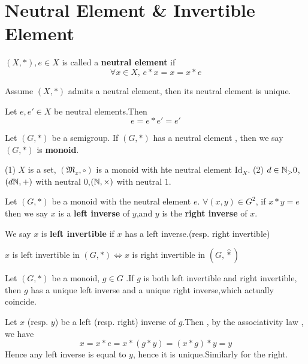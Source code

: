 \documentclass{book}
\numberwithin{equation}{section}
\begin{document}
\section{Neutral Element \& Invertible Element}
\begin{definitionenv}
    $(X,*),e\in X$ is called a \textbf{neutral element} if 
    $$\forall x\in X,\, e*x=x=x*e$$
\end{definitionenv}
\begin{propositionenv}
    Assume $(X,*)$ admits a neutral element, then its neutral element is unique.
\end{propositionenv}
\begin{proofenv}
    Let $e,e'\in X$ be neutral elements.Then 
    $$e=e*e'=e'$$
\end{proofenv}
\begin{definitionenv}
    Let $(G,*)$ be a semigroup. If $(G,*)$ has a neutral element , then we say $(G,*)$ is \textbf{monoid}.
\end{definitionenv}
\begin{exampleenv}
    \quad
    \newline
    (1) $X$ is a set, $(\mathfrak{M} _x,\circ)$ is a monoid with hte neutral element $\mathrm{Id}_X$.
    \newline
    (2) $d\in \mathbb{N}_>0$,$(d\mathbb{N},+)$ with neutral $0$,$(\mathbb{N},\times)$ with neutral $1$.
\end{exampleenv}
\begin{definitionenv}
    Let $(G,*)$ be a monoid with the neutral element $e$. $\forall (x,y)\in G^2$, if $x*y=e$ then we say $x$ is a \textbf{left inverse} of $y$,and $y$ is the \textbf{right inverse} of $x$.
\end{definitionenv}
\begin{remark}
    We say $x$ is \textbf{left invertible} if $x$ has a left inverse.(resp. right invertible)
\end{remark}
\begin{remark}
    $x$ is left invertible in $(G,*)\Leftrightarrow x $ is right invertible in $(G,\hat{*})$ 
\end{remark}
\begin{propositionenv}
    Let $(G,*)$ be a monoid, $g\in G$ .If $g$ is both left invertible and right invertible, then $g$ has a unique left inverse and a unique right inverse,which actually coincide.
\end{propositionenv}
\begin{proofenv}
    Let $x$ (resp. $y$) be a left (resp. right) inverse of $g$.Then , by the associativity law , we have 
    $$x=x*e=x*(g*y)=(x*g)*y=y$$
    Hence any left inverse is equal to $y$, hence it is unique.Similarly for the right.
\end{proofenv}
\end{document}
